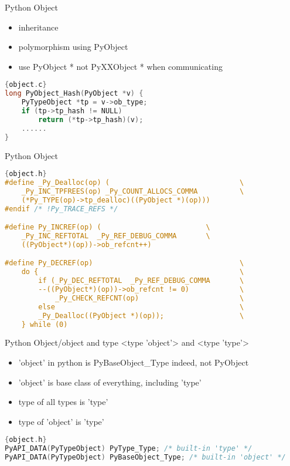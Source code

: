 \documentclass[xcolor=svgnames]{beamer}
\begin{document}
\begin{frame}[fragile]{Python Object}
  \begin{itemize}
    \item inheritance 
    \item polymorphism using PyObject
    \item use PyObject * not PyXXObject * when communicating
  \end{itemize}
\begin{lstlisting}[language=C]{object.c}
long PyObject_Hash(PyObject *v) {
    PyTypeObject *tp = v->ob_type;
    if (tp->tp_hash != NULL)
        return (*tp->tp_hash)(v);
    ......
}
\end{lstlisting} 
\end{frame}

\begin{frame}[fragile]{Python Object}
    \begin{lstlisting}[language=C]{object.h}
#define _Py_Dealloc(op) (                               \
    _Py_INC_TPFREES(op) _Py_COUNT_ALLOCS_COMMA          \
    (*Py_TYPE(op)->tp_dealloc)((PyObject *)(op)))
#endif /* !Py_TRACE_REFS */

#define Py_INCREF(op) (                         \
    _Py_INC_REFTOTAL  _Py_REF_DEBUG_COMMA       \
    ((PyObject*)(op))->ob_refcnt++)

#define Py_DECREF(op)                                   \
    do {                                                \
        if (_Py_DEC_REFTOTAL  _Py_REF_DEBUG_COMMA       \
        --((PyObject*)(op))->ob_refcnt != 0)            \
            _Py_CHECK_REFCNT(op)                        \
        else                                            \
        _Py_Dealloc((PyObject *)(op));                  \
    } while (0)
\end{lstlisting} 
\end{frame}


\begin{frame}[fragile]{Python Object/object and type}
    <type 'object'> and <type 'type'>
    \begin{itemize}
        \item 'object' in python is PyBaseObject\_Type indeed, not PyObject
        \item 'object' is base class of everything, including 'type'
        \item type of all types is 'type'
        \item type of 'object' is 'type'
    \end{itemize}
    \begin{lstlisting}[language=C]{object.h}
PyAPI_DATA(PyTypeObject) PyType_Type; /* built-in 'type' */
PyAPI_DATA(PyTypeObject) PyBaseObject_Type; /* built-in 'object' */
    \end{lstlisting} 
\end{frame}
\end{document}
